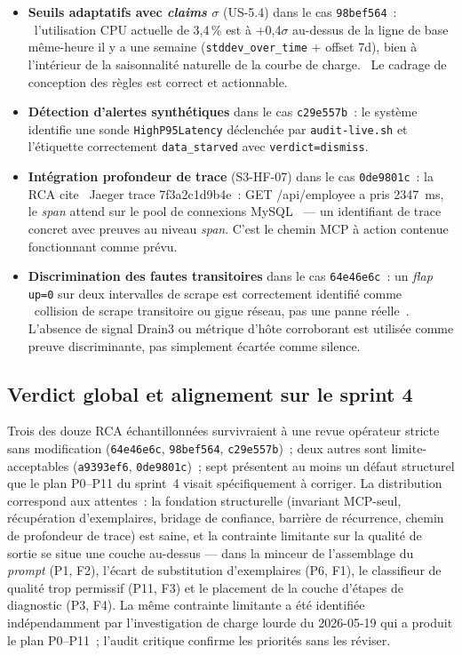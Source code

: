 \documentclass[11pt,a4paper,oneside]{report}
\begin{document}
\begin{itemize}
  \item \textbf{Seuils adaptatifs avec \emph{claims} $\sigma$}
        (US-5.4) dans le cas \texttt{98bef564}~: \og~l'utilisation
        CPU actuelle de 3,4\,\% est à +0,4$\sigma$ au-dessus de la
        ligne de base même-heure il y a une semaine
        (\texttt{stddev\_over\_time} + offset 7d), bien à
        l'intérieur de la saisonnalité naturelle de la courbe de
        charge.~\fg{} Le cadrage de conception des règles est correct
        et actionnable.
  \item \textbf{Détection d'alertes synthétiques} dans le cas
        \texttt{c29e557b}~: le système identifie une sonde
        \texttt{HighP95Latency} déclenchée par
        \texttt{audit-live.sh} et l'étiquette correctement
        \texttt{data\_starved} avec \texttt{verdict=dismiss}.
  \item \textbf{Intégration profondeur de trace} (S3-HF-07) dans le
        cas \texttt{0de9801c}~: la RCA cite \og~Jaeger trace
        7f3a2c1d9b4e~: GET /api/employee a pris 2347~ms, le
        \emph{span} attend sur le pool de connexions MySQL~\fg{}
        --- un identifiant de trace concret avec preuves au niveau
        \emph{span}. C'est le chemin MCP à action contenue
        fonctionnant comme prévu.
  \item \textbf{Discrimination des fautes transitoires} dans le cas
        \texttt{64e46e6c}~: un \emph{flap} \texttt{up=0} sur deux
        intervalles de scrape est correctement identifié comme
        \og~collision de scrape transitoire ou gigue réseau, pas
        une panne réelle~\fg{}. L'absence de signal Drain3 ou
        métrique d'hôte corroborant est utilisée comme preuve
        discriminante, pas simplement écartée comme silence.
\end{itemize}

\subsection{Verdict global et alignement sur le sprint 4}

Trois des douze RCA échantillonnées survivraient à une revue
opérateur stricte sans modification (\texttt{64e46e6c},
\texttt{98bef564}, \texttt{c29e557b})~; deux autres sont
limite-acceptables (\texttt{a9393ef6}, \texttt{0de9801c})~; sept
présentent au moins un défaut structurel que le plan P0--P11 du
sprint~4 visait spécifiquement à corriger. La distribution
correspond aux attentes~: la fondation structurelle (invariant
MCP-seul, récupération d'exemplaires, bridage de confiance,
barrière de récurrence, chemin de profondeur de trace) est saine,
et la contrainte limitante sur la qualité de sortie se situe une
couche au-dessus --- dans la minceur de l'assemblage du
\emph{prompt} (P1, F2), l'écart de substitution d'exemplaires (P6,
F1), le classifieur de qualité trop permissif (P11, F3) et le
placement de la couche d'étapes de diagnostic (P3, F4). La même
contrainte limitante a été identifiée indépendamment par
l'investigation de charge lourde du 2026-05-19 qui a produit le
plan P0--P11~; l'audit critique confirme les priorités sans les
réviser.
\end{document}
